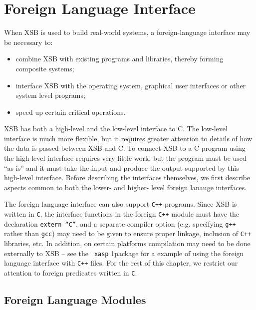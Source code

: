 \chapter{Foreign Language Interface}
\label{foreign}

When XSB is used to build real-world systems, a foreign-language
interface may be necessary to:
\begin{itemize}
\item combine XSB with existing programs and libraries, thereby
      forming composite systems;
\item interface XSB with the operating system, graphical user 
      interfaces or other system level programs;
\item speed up certain critical operations.
\end{itemize}

XSB has both a high-level and the low-level interface to C.  The
low-level interface is much more flexible, but it requires greater
attention to details of how the data is passed between XSB and C.  To
connect XSB to a C program using the high-level interface requires
very little work, but the program must be used ``as is'' and it must
take the input and produce the output supported by this high-level
interface.  Before describing the interfaces themselves, we first
describe aspects common to both the lower- and higher- level foreign
lanauge interfaces.

The foreign language interface can also support {\tt C++} programs.
Since XSB is written in {\tt C}, the interface functions in the
foreign {\tt C++} module must have the declaration {\tt extern ``C''},
and a separate compiler option (e.g. specifying {\tt g++} rather than
{\tt gcc}) may need to be given to ensure proper linkage, inclusion of
{\tt C++} libraries, etc.  In addition, on certain platforms
compilation may need to be done externally to XSB -- see the {\tt
  xasp} 1package for a example of using the foreign language interface
with {\tt C++} files.  For the rest of this chapter, we restrict our
attention to foreign predicates written in {\tt C}.

\section{Foreign Language Modules}

